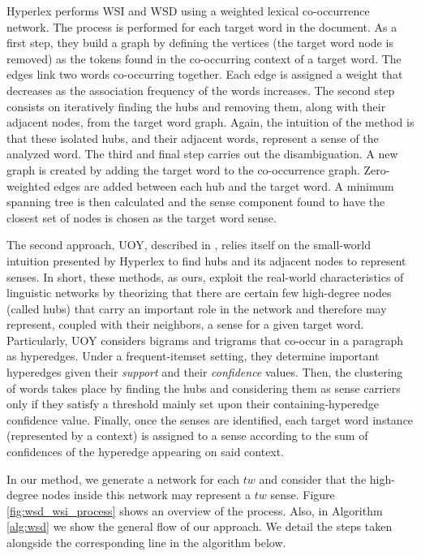 Hyperlex performs WSI and WSD using a weighted lexical co-occurrence network. The process is performed for each target word in the document. As a first step, they build a  graph by defining the vertices (the target word node is removed) as the tokens found in the  co-occurring  context of a target word. The edges link two words co-occurring together. Each edge is assigned a weight that decreases as the association frequency of the words increases. The second step consists on iteratively finding the hubs and removing them, along with their adjacent nodes, from the target word graph. Again, the intuition of the method is that these isolated hubs, and their adjacent words, represent a sense of the analyzed word. The third and final step carries out the disambiguation. A new graph is created by adding the target word to the co-occurrence graph. Zero-weighted edges are added between each hub and the target word. A minimum spanning tree is then calculated and the sense component found to have the closest set of nodes is chosen as the target word sense.

The second approach, {UOY}, described in \cite{2007.Klapaftis.UOY},  relies itself on the small-world intuition presented  by Hyperlex to find hubs and its adjacent nodes to represent senses.   In short, these methods, as ours, exploit the real-world characteristics of linguistic networks by theorizing that there are certain few high-degree nodes (called hubs) that carry an important role in the network and therefore may represent, coupled with their neighbors, a sense for a given target word. Particularly, UOY considers bigrams and trigrams that co-occur in a paragraph as hyperedges. Under a frequent-itemset setting, they determine important hyperedges given their \textit{support} and their \textit{confidence}  values. Then, the clustering of words takes place by finding the hubs and considering them as sense carriers only if they satisfy a threshold mainly set upon their containing-hyperedge confidence value. Finally, once the senses are identified, each target word instance (represented by a context) is assigned to a sense according to the sum of confidences of the hyperedge appearing on said context. 

In our method, we generate a network for each $tw$ and consider that the high-degree nodes inside this network may represent a $tw$ sense. Figure \ref{fig:wsd_wsi_process}  shows an overview of the process. Also, in Algorithm \ref{alg:wsd} we show the general flow of our approach.  We detail the steps taken alongside the corresponding line in the algorithm below. 

